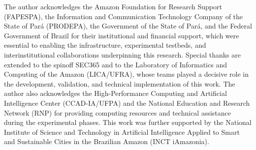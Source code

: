 \documentclass[journal]{IEEEtran}
\begin{document}
The author acknowledges the Amazon Foundation for Research Support (FAPESPA),
the Information and Communication Technology Company of the State of Par\'{a}
(PRODEPA), the Government of the State of Par\'{a}, and the Federal Government
of Brazil for their institutional and financial support, which were essential to
enabling the infrastructure, experimental testbeds, and interinstitutional
collaborations underpinning this research. Special thanks are extended to the
spinoff SEC365 and to the Laboratory of Informatics and Computing of the Amazon
(LICA/UFRA), whose teams played a decisive role in the development, validation,
and technical implementation of this work. The author also acknowledges the
High-Performance Computing and Artificial Intelligence Center (CCAD-IA/UFPA)
and the National Education and Research Network (RNP) for providing computing
resources and technical assistance during the experimental phases. This work
was further supported by the National Institute of Science and Technology in
Artificial Intelligence Applied to Smart and Sustainable Cities in the Brazilian
Amazon (INCT iAmazonia).

\FloatBarrier
\clearpage


\end{document}
